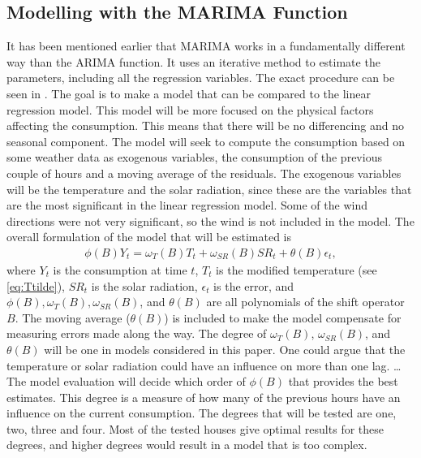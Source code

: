 \subsection{Modelling with the MARIMA Function}
It has been mentioned earlier that MARIMA works in a fundamentally different way than the ARIMA function. It uses an iterative method to estimate the parameters, including all the regression variables. The exact procedure can be seen in \cite{marima}. The goal is to make a model that can be compared to the linear regression model. This model will be more focused on the physical factors affecting the consumption. This means that there will be no differencing and no seasonal component. The model will seek to compute the consumption based on some weather data as exogenous variables, the consumption of the previous couple of hours and a moving average of the residuals. The exogenous variables will be the temperature and the solar radiation, since these are the variables that are the most significant in the linear regression model. Some of the wind directions were not very significant, so the wind is not included in the model. The overall formulation of the model that will be estimated is
\begin{align}
    \phi (B) Y_t =  \omega_{T}(B)T_t + \omega_{SR}(B)SR_t + \theta (B) \epsilon_t,
    \label{eq:MARIMA1}
\end{align}
where $Y_t$ is the consumption at time $t$, $T_t$ is the modified temperature (see \cref{eq:Ttilde}), $SR_t$ is the solar radiation, $\epsilon_t$ is the error, and $\phi(B), \omega_{T}(B), \omega_{SR}(B)$, and $\theta(B)$ are all polynomials of the shift operator $B$. The moving average ($\theta(B)$) is included to make the model compensate for measuring errors made along the way. The degree of $\omega_{T}(B)$, $\omega_{SR}(B)$, and $\theta(B)$ will be one in models considered in this paper. One could argue that the temperature or solar radiation could have an influence on more than one lag. \dots The model evaluation will decide which order of $\phi(B)$ that provides the best estimates. This degree is a measure of how many of the previous hours have an influence on the current consumption. The degrees that will be tested are one, two, three and four. Most of the tested houses give optimal results for these degrees, and higher degrees would result in a model that is too complex.


